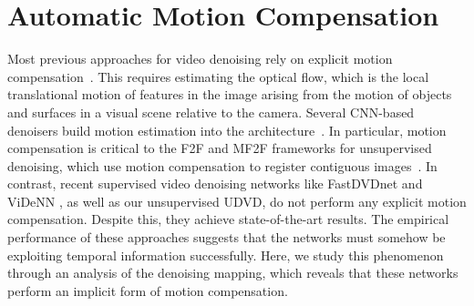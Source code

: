 \documentclass[final]{cvpr}
\begin{document}
\section{Automatic Motion Compensation}
\label{sec:analysis}

Most previous approaches for video denoising rely on explicit motion compensation~\cite{liu2010high, arias2018video, buades2016patch, vbm4d}. This requires estimating the optical flow, which is the local translational motion of features in the image arising from the motion of objects and surfaces in a visual scene relative to the camera. Several CNN-based denoisers build motion estimation into the architecture~\cite{dvdnet, xue2019video}. In particular, motion compensation is critical to the F2F and MF2F frameworks for unsupervised denoising, which use motion compensation to register contiguous images~\cite{f2f, F2F_extension, mf2f}. In contrast, recent supervised video denoising networks like FastDVDnet \cite{fastdvdnet} and ViDeNN \cite{videnn}, as well as our unsupervised UDVD, do not perform any explicit motion compensation. Despite this, they achieve state-of-the-art results.  The empirical performance of these approaches suggests that the networks must somehow be exploiting temporal information successfully. Here, we study this phenomenon through an analysis of the denoising mapping, which reveals that these networks perform an implicit form of motion compensation.
\end{document}
